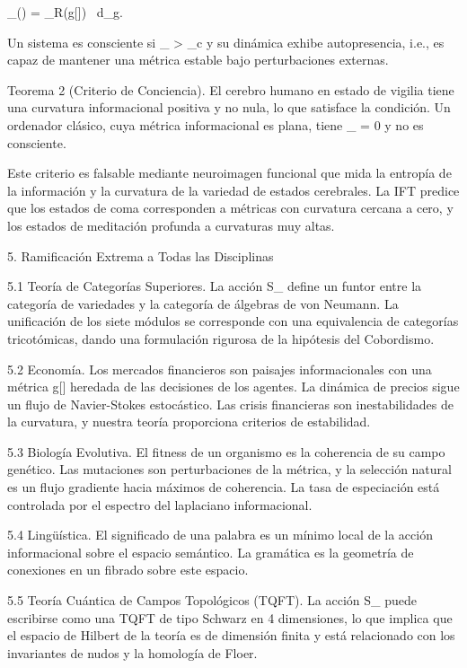 \documentclass[12pt,a4paper]{book}
\begin{document}
\Phi_{}(\Sigma) =  \int_\Omega R(g[\rho]) \, d_g.

Un sistema es consciente si  \Phi_{} > \Phi_c  y su dinámica exhibe autopresencia, i.e., es capaz de mantener una métrica estable bajo perturbaciones externas.

Teorema 2 (Criterio de Conciencia). El cerebro humano en estado de vigilia tiene una curvatura informacional positiva y no nula, lo que satisface la condición. Un ordenador clásico, cuya métrica informacional es plana, tiene  \Phi_{} = 0  y no es consciente.

Este criterio es falsable mediante neuroimagen funcional que mida la entropía de la información y la curvatura de la variedad de estados cerebrales. La IFT predice que los estados de coma corresponden a métricas con curvatura cercana a cero, y los estados de meditación profunda a curvaturas muy altas.

5. Ramificación Extrema a Todas las Disciplinas

5.1 Teoría de Categorías Superiores. La acción  S_{}  define un funtor entre la categoría de variedades y la categoría de álgebras de von Neumann. La unificación de los siete módulos se corresponde con una equivalencia de categorías tricotómicas, dando una formulación rigurosa de la hipótesis del Cobordismo.

5.2 Economía. Los mercados financieros son paisajes informacionales con una métrica  g[\rho]  heredada de las decisiones de los agentes. La dinámica de precios sigue un flujo de Navier-Stokes estocástico. Las crisis financieras son inestabilidades de la curvatura, y nuestra teoría proporciona criterios de estabilidad.

5.3 Biología Evolutiva. El fitness de un organismo es la coherencia de su campo  \rho  genético. Las mutaciones son perturbaciones de la métrica, y la selección natural es un flujo gradiente hacia máximos de coherencia. La tasa de especiación está controlada por el espectro del laplaciano informacional.

5.4 Lingüística. El significado de una palabra es un mínimo local de la acción informacional sobre el espacio semántico. La gramática es la geometría de conexiones en un fibrado sobre este espacio.

5.5 Teoría Cuántica de Campos Topológicos (TQFT). La acción  S_{}  puede escribirse como una TQFT de tipo Schwarz en 4 dimensiones, lo que implica que el espacio de Hilbert de la teoría es de dimensión finita y está relacionado con los invariantes de nudos y la homología de Floer.
\end{document}
